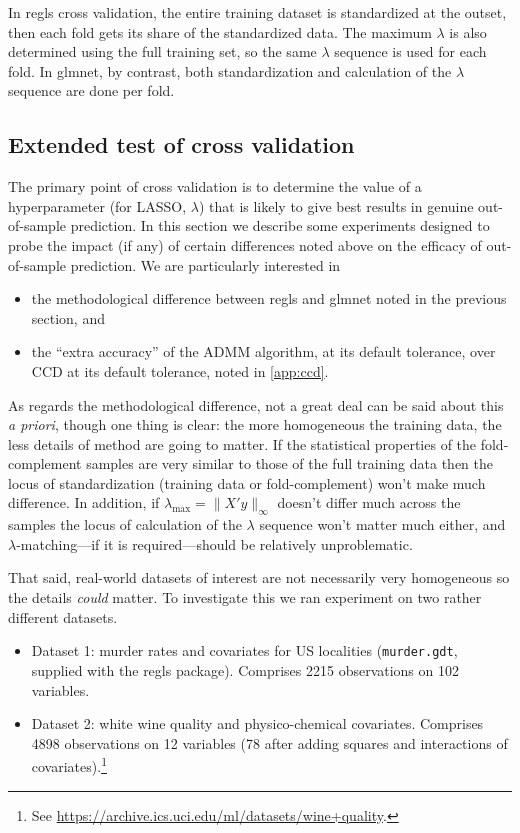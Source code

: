 \documentclass{article}
\begin{document}
In \textsf{regls} cross validation, the entire training dataset is
standardized at the outset, then each fold gets its share of the
standardized data. The maximum $\lambda$ is also determined using the
full training set, so the same $\lambda$ sequence is used for each
fold. In \textsf{glmnet}, by contrast, both standardization and
calculation of the $\lambda$ sequence are done per fold.

\subsection*{Extended test of cross validation}

The primary point of cross validation is to determine the value of a
hyperparameter (for LASSO, $\lambda$) that is likely to give best
results in genuine out-of-sample prediction. In this section we
describe some experiments designed to probe the impact (if any) of
certain differences noted above on the efficacy of out-of-sample
prediction. We are particularly interested in
\begin{itemize}
\item the methodological difference between \textsf{regls} and
  \textsf{glmnet} noted in the previous section, and
\item the ``extra accuracy'' of the ADMM algorithm, at its default
  tolerance, over CCD at its default tolerance, noted in
  \ref{app:ccd}.
\end{itemize}

As regards the methodological difference, not a great deal can be said
about this \textit{a priori}, though one thing is clear: the more
homogeneous the training data, the less details of method are going to
matter. If the statistical properties of the fold-complement samples
are very similar to those of the full training data then the locus of
standardization (training data or fold-complement) won't make much
difference. In addition, if $\lambda_{\max} = \|X'y\|_{\infty}$
doesn't differ much across the samples the locus of calculation of the
$\lambda$ sequence won't matter much either, and
$\lambda$-matching---if it is required---should be relatively
unproblematic.

That said, real-world datasets of interest are not necessarily very
homogeneous so the details \textit{could} matter. To investigate this
we ran experiment on two rather different datasets.
\begin{itemize}
\item Dataset 1: murder rates and covariates for US localities
  (\texttt{murder.gdt}, supplied with the \textsf{regls} package).
  Comprises 2215 observations on 102 variables.
\item Dataset 2: white wine quality and physico-chemical covariates.
  Comprises 4898 observations on 12 variables (78 after adding squares
  and interactions of covariates).\footnote{See
    \url{https://archive.ics.uci.edu/ml/datasets/wine+quality}.}
\end{itemize}
\end{document}
